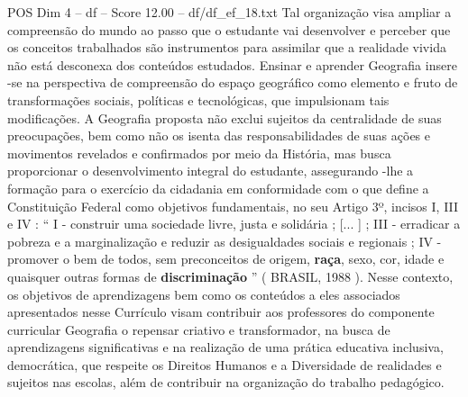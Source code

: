 \begin{textsample}{POS Dim 4 – df – Score 12.00 – df/df\_ef\_18.txt}
Tal organização visa ampliar a compreensão do mundo ao passo que o estudante vai desenvolver e perceber que os conceitos trabalhados são instrumentos para assimilar que a realidade vivida não está desconexa dos conteúdos estudados.
Ensinar e aprender Geografia insere -se na perspectiva de compreensão do espaço geográfico como elemento e fruto de transformações sociais, políticas e tecnológicas, que impulsionam tais modificações.
A Geografia proposta não exclui sujeitos da centralidade de suas preocupações, bem como não os isenta das responsabilidades de suas ações e movimentos revelados e confirmados por meio da História, mas busca proporcionar o desenvolvimento integral do estudante, assegurando -lhe a formação para o exercício da cidadania em conformidade com o que define a Constituição Federal como objetivos fundamentais, no seu Artigo 3º, incisos I, III e IV : “ I - construir uma sociedade livre, justa e solidária ; [... ] ; III - erradicar a pobreza e a marginalização e reduzir as desigualdades sociais e regionais ; IV - promover o bem de todos, sem preconceitos de origem, \textbf{raça}, sexo, cor, idade e quaisquer outras formas de \textbf{discriminação} ” ( BRASIL, 1988 ).
Nesse contexto, os objetivos de aprendizagens bem como os conteúdos a eles associados apresentados nesse Currículo visam contribuir aos professores do componente curricular Geografia o repensar criativo e transformador, na busca de aprendizagens significativas e na realização de uma prática educativa inclusiva, democrática, que respeite os Direitos Humanos e a Diversidade de realidades e sujeitos nas escolas, além de contribuir na organização do trabalho pedagógico.

\end{textsample}

